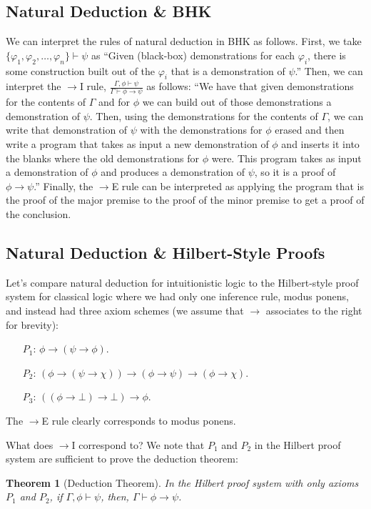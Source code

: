 \documentclass[12pt]{article}
\newtheorem{theorem}{Theorem}
\begin{document}
\subsection{Natural Deduction \& BHK}
We can interpret the rules of natural deduction in BHK as follows. First, we take $\{\varphi_1,\varphi_2,\dots,\varphi_n\}\vdash \psi$ as 
``Given (black-box) demonstrations for each $\varphi_i$, there is some construction built out of the $\varphi_i$ that is a demonstration of $\psi$.''
Then, we can interpret the $\to$I rule, $\frac{\Gamma,\phi\vdash\psi}{\Gamma\vdash\phi\to\psi}$ as follows: 
``We have that given demonstrations for the contents of $\Gamma$ and for $\phi$ we can build out of those demonstrations a demonstration of $\psi$. 
Then, using the demonstrations for the contents of $\Gamma$, we can write that demonstration of $\psi$ with the demonstrations for $\phi$ erased 
and then write a program that takes as input a new demonstration of $\phi$ and inserts it into the blanks where the old demonstrations for $\phi$ were.  
This program takes as input a demonstration of $\phi$ and produces a demonstration of $\psi$, so it is a proof of $\phi\to\psi$.''
Finally, the $\to$E rule can be interpreted as applying the program that is the proof of the major premise to the proof of the minor premise 
to get a proof of the conclusion. 

\subsection{Natural Deduction \& Hilbert-Style Proofs}
Let's compare natural deduction for intuitionistic logic to
the Hilbert-style proof system for classical logic where we had only one inference rule, modus ponens, and instead had three axiom schemes
(we assume that $\to$ associates to the right for brevity):
\begin{itemize}
\item[$P_1$:] $\phi\to(\psi\to\phi)$. 
\item[$P_2$:] $(\phi\to(\psi\to\chi)) \to (\phi\to\psi)\to(\phi\to\chi)$.
\item[$P_3$:] $((\phi\to\bot)\to\bot)\to\phi$. 
\end{itemize}
The $\to$E rule clearly corresponds to modus ponens. 

What does $\to$I correspond to? We note that $P_1$ and $P_2$ in the Hilbert proof system are sufficient to prove the deduction theorem: 
\begin{theorem}[Deduction Theorem]
In the Hilbert proof system with only axioms $P_1$ and $P_2$, if $\Gamma,\phi\vdash\psi$, then, $\Gamma\vdash\phi\to\psi$.
\end{theorem}
 
\end{document}
